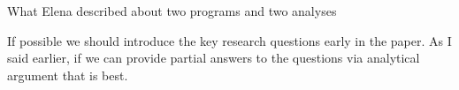 What Elena described about two programs and two analyses

If possible we should introduce the key research questions
early in the paper.  As I said earlier, if we can provide
partial answers to the questions via analytical argument
that is best.

